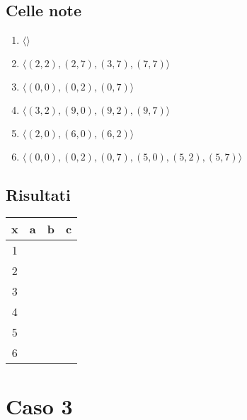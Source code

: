 \documentclass[11pt]{article}
\begin{document}
\subsection{Celle note}
\begin{enumerate}
    \item $\langle \rangle$
    \item $\langle (2, 2), (2, 7), (3, 7), (7, 7) \rangle$
    \item $\langle (0, 0), (0, 2), (0, 7) \rangle$
    \item $\langle (3, 2), (9, 0), (9, 2), (9, 7) \rangle$
    \item $\langle (2, 0), (6, 0), (6, 2) \rangle$
    \item $\langle (0, 0), (0, 2), (0, 7), (5, 0), (5, 2), (5, 7) \rangle$
\end{enumerate}

\subsection{Risultati}
\begin{table}[H]
    \begin{tabular}{|c|c|c|c|}
    \hline
    x & a & b & c \\ \hline \hline
    1 &  &  &  \\ \hline
    2 &  &  &  \\ \hline
    3 &  &  &  \\ \hline
    4 &  &  &  \\ \hline
    5 &  &  &  \\ \hline
    6 &  &  &  \\ \hline
    \end{tabular}
\end{table}

\section{Caso 3}
\end{document}

